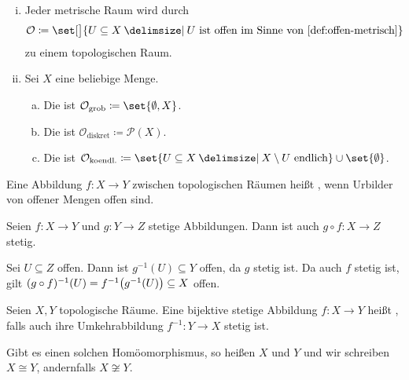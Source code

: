 \begin{beispiel}[{name=[topologische Räume]}]
	\begin{enumerate}[(i)]
		\item Jeder metrische Raum wird durch 
		\[
			\mathcal{O} \coloneqq \set[\big]{U \subseteq X \given U \text{ ist offen im Sinne von \cref{def:offen-metrisch}}} 
		\]
		zu einem topologischen Raum.
		\item Sei $X$ eine beliebige Menge.
		\begin{enumerate}[(a)]
			\item Die  ist $\mathcal{O}_{\text{grob}} \coloneqq \set{\emptyset, X}$.
			\item Die  ist $\mathcal{O}_{\text{diskret}} \coloneqq \mathcal{P}(X)$.
			\item Die   ist 
			$\mathcal{O}_{\text{koendl.}} \coloneqq \set{U \subseteq X \given X \setminus U \text{ endlich}} \cup \set{\emptyset}$.
		\end{enumerate}
	\end{enumerate}
\end{beispiel}

\begin{definition}[{name=[Stetigkeit in topologischen Räumen]}]
	Eine Abbildung $f \colon X \to Y$ zwischen topologischen Räumen heißt , wenn Urbilder von offener Mengen offen sind.
\end{definition}

\begin{lemma}[{name=[Verknüpfung stetiger Abbildungen]}]
	Seien $f \colon X \to Y$ und $g \colon Y \to Z$ stetige Abbildungen. 
	Dann ist auch $g \circ f \colon X \to Z$ stetig.
\end{lemma}
\begin{beweis}
	Sei $U \subseteq Z$ offen. 
	Dann ist $g ^{-1}(U) \subseteq Y$ offen, da $g$ stetig ist. 
	Da auch $f$ stetig ist, gilt 
	$\enbrace{g \circ f } ^{-1} (U) = f ^{-1} \enbrace[\big]{g^{-1} (U)} \subseteq X$ offen.
\end{beweis}

\begin{definition}[{name=[Homöomorphismus]}]
	Seien $X,Y$ topologische Räume. 
	Eine bijektive stetige Abbildung $f \colon X \to Y$ heißt , falls auch ihre Umkehrabbildung  $f^{-1} \colon Y \to X$ 
	stetig ist.
	
	Gibt es einen solchen Homöomorphismus, so heißen $X$ und $Y$  und wir schreiben $X \cong Y$, andernfalls $X \not\cong Y$.
\end{definition}

